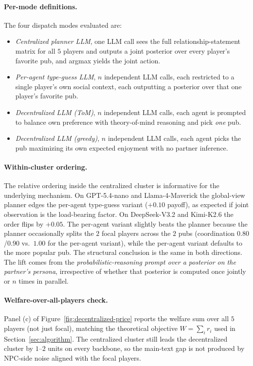 \paragraph{Per-mode definitions.} The four dispatch modes evaluated are:
\begin{itemize}\itemsep -1pt \topsep -2pt
  \item \emph{Centralized planner LLM}, one LLM call sees the full relationship-statement matrix for all $5$ players and outputs a joint posterior over every player's favorite pub, and argmax yields the joint action.
  \item \emph{Per-agent type-guess LLM}, $n$ independent LLM calls, each restricted to a single player's own social context, each outputting a posterior over that one player's favorite pub.
  \item \emph{Decentralized LLM (ToM)}, $n$ independent LLM calls, each agent is prompted to balance own preference with theory-of-mind reasoning and pick \emph{one} pub.
  \item \emph{Decentralized LLM (greedy)}, $n$ independent LLM calls, each agent picks the pub maximizing its own expected enjoyment with no partner inference.
\end{itemize}

\paragraph{Within-cluster ordering.} The relative ordering inside the centralized cluster is informative for the underlying mechanism. On GPT-5.4-nano and Llama-4-Maverick the global-view planner edges the per-agent type-guess variant ($+0.10$ payoff), as expected if joint observation is the load-bearing factor. On DeepSeek-V3.2 and Kimi-K2.6 the order flips by $+0.05$. The per-agent variant slightly beats the planner because the planner occasionally splits the $2$ focal players across the $2$ pubs (coordination $0.80$/$0.90$ vs.\ $1.00$ for the per-agent variant), while the per-agent variant defaults to the more popular pub. The structural conclusion is the same in both directions. The lift comes from the \emph{probabilistic-reasoning prompt over a posterior on the partner's persona}, irrespective of whether that posterior is computed once jointly or $n$ times in parallel.

\paragraph{Welfare-over-all-players check.} Panel (c) of Figure~\ref{fig:decentralized-price} reports the welfare sum over all $5$ players (not just focal), matching the theoretical objective $W = \sum_i r_i$ used in Section~\ref{sec:algorithm}. The centralized cluster still leads the decentralized cluster by $1$--$2$ units on every backbone, so the main-text gap is not produced by NPC-side noise aligned with the focal players.

